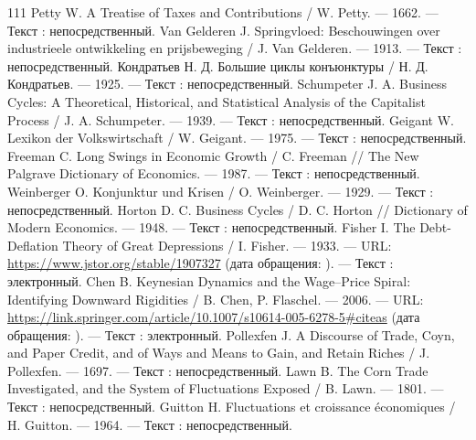 \begin{RaggedRight}
\begin{thebibliography}{111}
     \hypertarget{bib:Petty-1662}{} Petty W. A Treatise of Taxes and Contributions / W. Petty. --- 1662. --- Текст : непосредственный.
     \hypertarget{bib:Van-Gelderen-1913}{} Van Gelderen J. Springvloed: Beschouwingen over industrieele ontwikkeling en prijsbeweging / J. Van Gelderen. --- 1913. --- Текст : непосредственный.
     \hypertarget{bib:Кондратьев-1925}{} Кондратьев Н. Д. Большие циклы конъюнктуры / Н. Д. Кондратьев. --- 1925. --- Текст : непосредственный.
     \hypertarget{bib:Schumpeter-1939}{} Schumpeter J. A. Business Cycles: A Theoretical, Historical, and Statistical Analysis of the Capitalist Process / J. A. Schumpeter. --- 1939. --- Текст : непосредственный.
     \hypertarget{bib:Geigant-1975}{} Geigant W. Lexikon der Volkswirtschaft / W. Geigant. --- 1975. --- Текст : непосредственный.
     \hypertarget{bib:Freeman-1987}{} Freeman C. Long Swings in Economic Growth / C. Freeman // The New Palgrave Dictionary of Economics. --- 1987. --- Текст : непосредственный.
     \hypertarget{bib:Weinberger-1929}{} Weinberger O. Konjunktur und Krisen / O. Weinberger. --- 1929. --- Текст : непосредственный.
     \hypertarget{bib:Horton-1948}{} Horton D. C. Business Cycles / D. C. Horton // Dictionary of Modern Economics. --- 1948. --- Текст : непосредственный.
     \hypertarget{bib:Fisher-1933}{} Fisher I. The Debt-Deflation Theory of Great Depressions / I. Fisher. --- 1933. --- URL: \url{https://www.jstor.org/stable/1907327} (дата обращения: \bibaccessdate). --- Текст : электронный.
     \hypertarget{bib:Chen-2006}{} Chen B. Keynesian Dynamics and the Wage--Price Spiral: Identifying Downward Rigidities / B. Chen, P. Flaschel. --- 2006. --- URL: \url{https://link.springer.com/article/10.1007/s10614-005-6278-5#citeas} (дата обращения: \bibaccessdate). --- Текст : электронный.
     \hypertarget{bib:Pollexfen-1697}{} Pollexfen J. A Discourse of Trade, Coyn, and Paper Credit, and of Ways and Means to Gain, and Retain Riches / J. Pollexfen. --- 1697. --- Текст : непосредственный.
     \hypertarget{bib:Lawn-1801}{} Lawn B. The Corn Trade Investigated, and the System of Fluctuations Exposed / B. Lawn. --- 1801. --- Текст : непосредственный.
     \hypertarget{bib:Guitton-1964}{} Guitton H. Fluctuations et croissance économiques / H. Guitton. --- 1964. --- Текст : непосредственный.

\end{thebibliography}
\end{RaggedRight}
